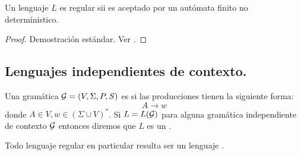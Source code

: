 \documentclass[tesis.tex]{subfiles}
\begin{document}
\begin{teo}
 Un lenguaje $L$ es regular sii es aceptado por un autómata finito no determínistico.
\end{teo}

\begin{proof}
	Demostración estándar. Ver \cite{hopcraft-ullman}.
\end{proof}









\subsection{Lenguajes independientes de contexto.}
\begin{deff}
	Una gramática ${\cal G} = (V, \Sigma, P, S) $ es  si las producciones tienen la siguiente forma:
	\begin{equation*}
	A \to w
	\end{equation*}
	donde $A \in V, w \in (\Sigma \cup V)^*$.  
	Si $L=L({\cal G})$ para alguna gramática independiente de contexto $\cal G$ entonces diremos que $L$ es un .
\end{deff}

\begin{obs}
	Todo lenguaje regular en particular resulta ser un lenguaje \ic.
\end{obs}
\end{document}
